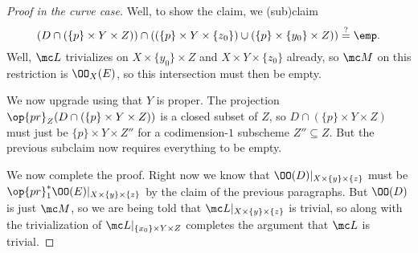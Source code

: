 \documentclass[../notes.tex]{subfiles}
\begin{document}
\begin{proof}[Proof in the curve case]
	Well, to show the claim, we (sub)claim
	\[(D\cap(\{p\}\times Y\times Z))\cap((\{p\}\times Y\times\{z_0\})\cup(\{p\}\times\{y_0\}\times Z))\stackrel?=\emp.\]
	Well, $\mc L$ trivializes on $X\times\{y_0\}\times Z$ and $X\times Y\times\{z_0\}$ already, so $\mc M$ on this restriction is $\OO_X(E)$, so this intersection must then be empty.

	We now upgrade using that $Y$ is proper. The projection $\op{pr}_Z(D\cap(\{p\}\times Y\times Z))$ is a closed subset of $Z$, so $D\cap(\{p\}\times Y\times Z)$ must just be $\{p\}\times Y\times Z''$ for a codimension-$1$ subscheme $Z''\subseteq Z$. But the previous subclaim now requires everything to be empty.

	We now complete the proof. Right now we know that $\OO(D)|_{X\times\{y\}\times\{z\}}$ must be $\op{pr}_1^*\OO(E)|_{X\times\{y\}\times\{z\}}$ by the claim of the previous paragraphs. But $\OO(D)$ is just $\mc M$, so we are being told that $\mc L|_{X\times\{y\}\times\{z\}}$ is trivial, so  along with the trivialization of $\mc L|_{\{x_0\}\times Y\times Z}$ completes the argument that $\mc L$ is trivial.
\end{proof}
\end{document}
